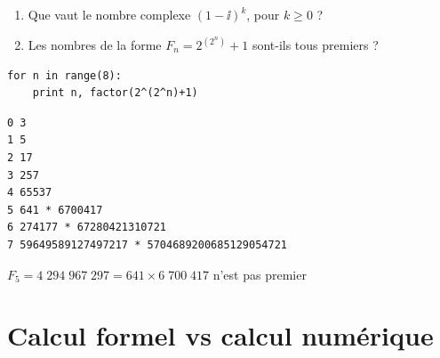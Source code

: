 \begin{frame}[fragile]

\begin{tp}
\begin{enumerate}
  \item Que vaut le nombre complexe $(1-\ii)^k$, pour $k\ge 0$ ?
  \item Les nombres de la forme $F_n = 2^{(2^n)}+1$ sont-ils tous premiers ?
\end{enumerate}  
\end{tp}

\begin{algo}
\begin{lstlisting}
for n in range(8):
    print n, factor(2^(2^n)+1)
\end{lstlisting}
\end{algo}

\pause
{\small
\begin{lstlisting}
0 3
1 5
2 17
3 257
4 65537
5 641 * 6700417
6 274177 * 67280421310721
7 59649589127497217 * 5704689200685129054721
\end{lstlisting}
}
\pause
$F_5 = 4\;294\;967\;297 = 641 \times 6\;700\;417$ n'est pas premier

\end{frame}







\section{Calcul formel vs calcul numérique}

